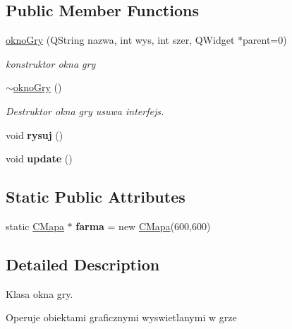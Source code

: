 \subsection*{Public Member Functions}
\begin{DoxyCompactItemize}
\item 
\mbox{\hyperlink{classokno_gry_abfcbe8e28b577ae1fa32b22243deef8d}{okno\+Gry}} (Q\+String nazwa, int wys, int szer, Q\+Widget $\ast$parent=0)
\begin{DoxyCompactList}\small\item\em konstruktor okna gry \end{DoxyCompactList}\item 
\mbox{\label{classokno_gry_a9974437d649287183be90b53dc7d1944}} 
\mbox{\hyperlink{classokno_gry_a9974437d649287183be90b53dc7d1944}{$\sim$okno\+Gry}} ()
\begin{DoxyCompactList}\small\item\em Destruktor okna gry usuwa interfejs. \end{DoxyCompactList}\item 
\mbox{\label{classokno_gry_acb152f87a59a6ae464124e3de471fc4d}} 
void {\bfseries rysuj} ()
\item 
\mbox{\label{classokno_gry_a4bef60c2051cb0f3d06f1f394e06bc89}} 
void {\bfseries update} ()
\end{DoxyCompactItemize}
\subsection*{Static Public Attributes}
\begin{DoxyCompactItemize}
\item 
\mbox{\label{classokno_gry_abb72103cf3f804a399f524a63cb40cf5}} 
static \mbox{\hyperlink{class_c_mapa}{C\+Mapa}} $\ast$ {\bfseries farma} = new \mbox{\hyperlink{class_c_mapa}{C\+Mapa}}(600,600)
\end{DoxyCompactItemize}


\subsection{Detailed Description}
Klasa okna gry. 

Operuje obiektami graficznymi wyswietlanymi w grze 

